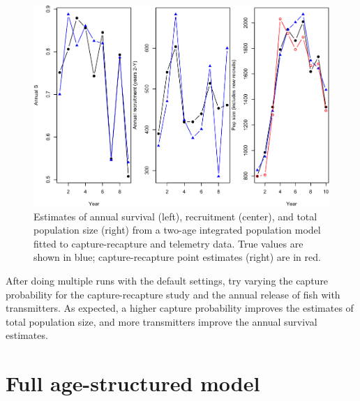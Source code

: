 \documentclass[
]{krantz}
\begin{document}
\begin{figure}
\includegraphics[width=0.9\linewidth]{bookdown_files/figure-latex/TwoAgePlot-1} \caption{Estimates of annual survival (left), recruitment (center), and total population size (right) from a two-age integrated population model fitted to capture-recapture and telemetry data. True values are shown in blue; capture-recapture point estimates (right) are in red.}\label{fig:TwoAgePlot}
\end{figure}

After doing multiple runs with the default settings, try varying the capture probability for the capture-recapture study and the annual release of fish with transmitters. As expected, a higher capture probability improves the estimates of total population size, and more transmitters improve the annual survival estimates.

\hypertarget{CAGEAN}{%
\section{Full age-structured model}\label{CAGEAN}}
\end{document}
